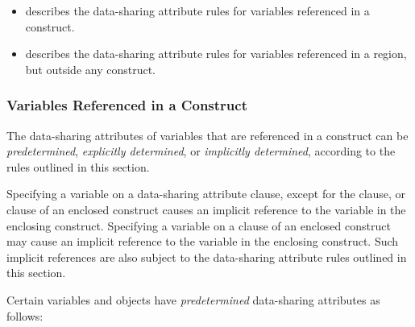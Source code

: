 \begin{itemize}
\item {} describes the 
      data-sharing attribute rules for variables referenced in a construct.
\item {} 
      describes the data-sharing attribute rules for variables referenced in a 
      region, but outside any construct.
\end{itemize}



\subsubsection{Variables Referenced in a Construct}
\label{subsubsec:Variables Referenced in a Construct}
The data-sharing attributes of variables that are referenced in a construct can be
\emph{predetermined}, \emph{explicitly determined}, or \emph{implicitly determined}, 
according to the rules outlined in this section.

Specifying a variable on a data-sharing attribute clause, except for the 
 clause, or  clause of an enclosed construct 
causes an implicit reference to the variable in the enclosing construct. 
Specifying a variable on a  clause of an enclosed construct may 
cause an implicit reference to the variable in the enclosing construct.
Such implicit references are also subject to the data-sharing attribute 
rules outlined in this section.

Certain variables and objects have \emph{predetermined} data-sharing 
attributes as follows:

